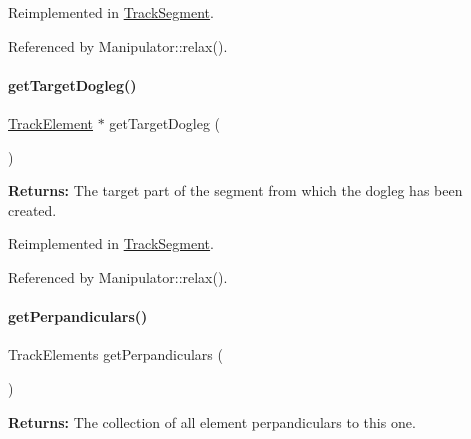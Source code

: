 Reimplemented in \hyperlink{classKite_1_1TrackSegment_a7e79fbfe77f173d46b1959c41087930a}{Track\+Segment}.



Referenced by Manipulator\+::relax().

\mbox{\label{classKite_1_1TrackElement_aeb4e39bd925d093e6c45599433bb421c}} 
\paragraph{\texorpdfstring{get\+Target\+Dogleg()}{getTargetDogleg()}}
{\footnotesize\ttfamily \hyperlink{classKite_1_1TrackElement}{Track\+Element} $\ast$ get\+Target\+Dogleg (\begin{DoxyParamCaption}{ }\end{DoxyParamCaption})\hspace{0.3cm}{\ttfamily [virtual]}}

{\bfseries Returns\+:} The target part of the segment from which the dogleg has been created. 

Reimplemented in \hyperlink{classKite_1_1TrackSegment_aeb4e39bd925d093e6c45599433bb421c}{Track\+Segment}.



Referenced by Manipulator\+::relax().

\mbox{\label{classKite_1_1TrackElement_aa0ba92ebf19f596537dc051c090d5736}} 
\paragraph{\texorpdfstring{get\+Perpandiculars()}{getPerpandiculars()}}
{\footnotesize\ttfamily Track\+Elements get\+Perpandiculars (\begin{DoxyParamCaption}{ }\end{DoxyParamCaption})\hspace{0.3cm}{\ttfamily [virtual]}}

{\bfseries Returns\+:} The collection of all element perpandiculars to this one. 

